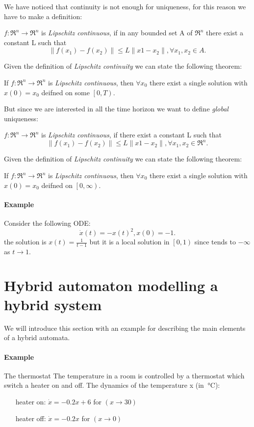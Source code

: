 We have noticed that continuity is not enough for uniqueness, for this reason we have to make a definition:

\begin{defn} 
	$f\colon\Re^n\to\Re^n$ is \emph{Lipschitz continuous}, if in any bounded set A of $\Re^n$ there exist a constant L such that
	\[
	\|f(x_1)-f(x_2)\| \le L \|x1-x_2\|, \forall x_1,x_2 \in A.
	\]
\end{defn}

Given the definition of \emph{Lipschitz continuity} we can state the following theorem:

\begin{thm}
	If $f\colon\Re^n\to\Re^n$ is \emph{Lipschitz continuous}, then $\forall x_0$ there exist a single solution with $x(0)=x_0$ deifned on some $ \left[0,T\right)$.
\end{thm}
But since we are interested in all the time horizon we want to define \emph{global} uniqueness:
\begin{defn} 
	$f\colon\Re^n\to\Re^n$ is \emph{Lipschitz continuous}, if there exist a constant L such that
	\[
	\|f(x_1)-f(x_2)\| \le L \|x1-x_2\|, \forall x_1,x_2 \in \Re^n.
	\]
\end{defn}

Given the definition of \emph{Lipschitz continuity} we can state the following theorem:

\begin{thm}
	If $f\colon\Re^n\to\Re^n$ is \emph{Lipschitz continuous}, then $\forall x_0$ there exist a single solution with $x(0)=x_0$ deifned on $ \left[0,\infty\right)$.
\end{thm}
\paragraph{Example}
Consider the following ODE: 
\[
\dot{x}(t)=-x(t)^2, x(0)=-1.
\]
the solution is $x(t)=\frac{1}{t-1}$ but it is a local solution in $\left[0,1\right)$ since tends to $-\infty$ as $t\to 1$.
\section{Hybrid automaton modelling a hybrid system}
We will introduce this section with an example for describing the main elements of a hybrid automata.
\paragraph{Example} The thermostat
The temperature in a room is controlled by a thermostat which switch a heater on and off.
The dynamics of the temperature x (in $\SI{}{\celsius}$):
\begin{center}
	\begin{itemize}
		
		\item[heater on:] $\dot{x} = -0.2x+6 $ for $(x\to30)$
		\item[heater off:]$\dot{x}= -0.2x $  for $ (x\to 0)$
	\end{itemize} 
\end{center}

